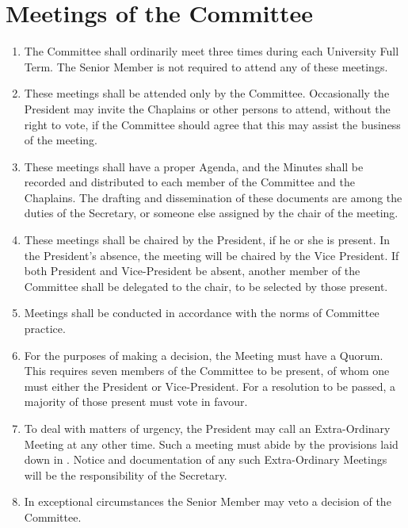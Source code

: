 \documentclass[11pt]{article}
\begin{document}
\section{Meetings of the Committee}\label{byl:mee}
\begin{enumerate}
\item The Committee shall ordinarily meet three times during each University Full Term. The Senior Member is not required to attend any of these meetings.
\item \label{mee:att} These meetings shall be attended only by the Committee. Occasionally the President may invite the Chaplains or other persons to attend, without the right to vote, if the Committee should agree that this may assist the business of the meeting.
\item These meetings shall have a proper Agenda, and the Minutes shall be recorded and distributed to each member of the Committee and the Chaplains. The drafting and dissemination of these documents are among the duties of the Secretary, or someone else assigned by the chair of the meeting.
\item These meetings shall be chaired by the President, if he or she is present. In the President's absence, the meeting will be chaired by the Vice President. If both President and Vice-President be absent, another member of the Committee shall be delegated to the chair, to be selected by those present.
\item Meetings shall be conducted in accordance with the norms of Committee practice.
\item \label{mee:quo} For the purposes of making a decision, the Meeting must have a Quorum. This requires seven members of the Committee to be present, of whom one must either the President or Vice-President. For a resolution to be passed, a majority of those present must vote in favour.
\item To deal with matters of urgency, the President may call an Extra-Ordinary Meeting at any other time. Such a meeting must abide by the provisions laid down in . Notice and documentation of any such Extra-Ordinary Meetings will be the responsibility of the Secretary.
\item In exceptional circumstances the Senior Member may veto a decision of the Committee. 
\end{enumerate}
\end{document}
